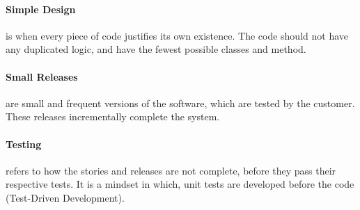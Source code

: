 \paragraph{Simple Design} is when every piece of code justifies its own existence. The code should not have any duplicated logic, and have the fewest possible classes and method. %

\paragraph{Small Releases} are small and frequent versions of the software, which are tested by the customer.
These releases incrementally complete the system.

\paragraph{Testing} refers to how the stories and releases are not complete, before they pass their respective tests. It is a mindset in which, unit tests are developed before the code (Test-Driven Development).

